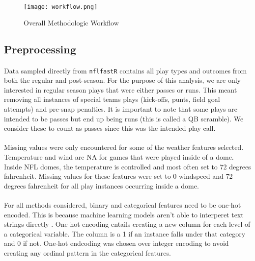 \documentclass[11pt]{article}
\begin{document}
        \begin{figure}[ht]
            \texttt{[image: workflow.png]}
            \caption{Overall Methodologic Workflow }
            \label{fig:workflow}
        \end{figure}
        \begin{multicols*}{2}

        \subsection{Preprocessing}
            \paragraph{}
                Data sampled directly from \texttt{nflfastR} contains all play types and outcomes from both the regular and post-season. 
                For the purpose of this analysis, we are only interested in regular season plays that were either passes or runs. 
                This meant removing all instances of special teams plays (kick-offs, punts, field goal attempts) and pre-snap penalties. 
                It is important to note that some plays are intended to be passes but end up being runs (this is called a QB scramble). 
                We consider these to count as passes since this was the intended play call.   
            
        \vspace{-10pt}

            \paragraph{}
                Missing values were only encountered for some of the weather features selected.
                Temperature and wind are NA for games that were played inside of a dome. 
                Inside NFL domes, the temperature is controlled and most often set to 72 degrees fahrenheit.
                Missing values for these features were set to 0 windspeed and 72 degrees fahrenheit for all play instances occurring inside a dome. 
            
        \vspace{-10pt}

            \paragraph{}
                For all methods considered, binary and categorical features need to be one-hot encoded.
                This is because machine learning models aren't able to interperet text strings directly \cite{Brownlee20}. 
                One-hot encoding entails creating a new column for each level of a categorical variable. 
                The column is a 1 if an instance falls under that category and 0 if not. 
                One-hot endcoding was chosen over integer encoding to avoid creating any ordinal pattern in the categorical features. 
        

\end{multicols*}
\end{document}
